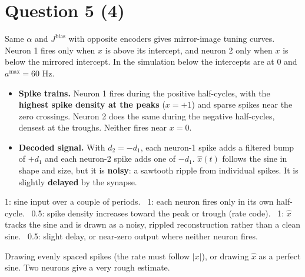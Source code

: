 \documentclass[11pt,letterpaper]{article}
\newcommand{\Jb}{J^{\mathrm{bias}}}
\begin{document}
\section*{Question 5 \hfill (4)}
Same $\alpha$ and $\Jb$ with opposite encoders gives mirror-image tuning curves. Neuron 1 fires only when $x$ is above its intercept, and neuron 2 only when $x$ is below the mirrored intercept. In the simulation below the intercepts are at $0$ and $a^{\max} = 60$ Hz.
\begin{itemize}[leftmargin=1.2em]
\item \textbf{Spike trains.} Neuron 1 fires during the positive half-cycles, with the \textbf{highest spike density at the peaks} ($x = +1$) and sparse spikes near the zero crossings. Neuron 2 does the same during the negative half-cycles, densest at the troughs. Neither fires near $x = 0$.
\item \textbf{Decoded signal.} With $d_2 = -d_1$, each neuron-1 spike adds a filtered bump of $+d_1$ and each neuron-2 spike adds one of $-d_1$. $\hat x(t)$ follows the sine in shape and size, but it is \textbf{noisy}: a sawtooth ripple from individual spikes. It is slightly \textbf{delayed} by the synapse.
\end{itemize}
\begin{center}
\end{center}
\begin{marking}
1: sine input over a couple of periods. \ 1: each neuron fires only in its own half-cycle. \ 0.5: spike density increases toward the peak or trough (rate code). \ 1: $\hat x$ tracks the sine and is drawn as a noisy, rippled reconstruction rather than a clean sine. \ 0.5: slight delay, or near-zero output where neither neuron fires.
\end{marking}
\begin{trap}
Drawing evenly spaced spikes (the rate must follow $|x|$), or drawing $\hat x$ as a perfect sine. Two neurons give a very rough estimate.
\end{trap}
\end{document}
